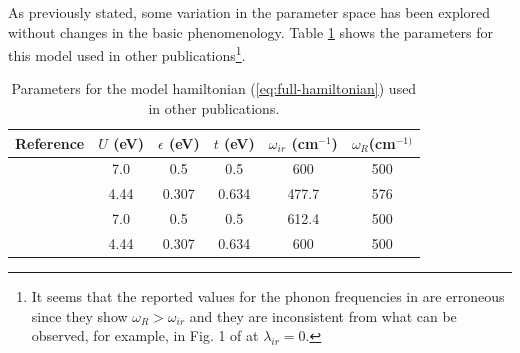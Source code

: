 As previously stated, some variation in the parameter space has been explored without changes in the basic phenomenology. Table \ref{tab:parameters} shows the parameters for this model used in other publications\footnote{It seems that the reported values for the phonon frequencies in \cite{Salkola1994, Salkola1995} are erroneous since they show $\omega_R > \omega_{ir}$ and they are inconsistent from what can be observed, for example, in Fig. 1 of \cite{Salkola1994} at $\lambda_{ir}=0$.}.

\begin{table}[ht]
  \centering
  \begin{tabular}[h]{| l | c | c | c | c | c |}
    \hline
    Reference & $U$ (eV) & $\epsilon$ (eV) & $t$ (eV) & $\omega_{ir}$ (cm$^{-1}$) & $\omega_R$(cm$^{-1)}$ \\
    \hline
    \cite{MustredeLeon1992} & 7.0 & 0.5 & 0.5 & 600 & 500 \\ 
    \cite{Salkola1994, Salkola1995} & 4.44 & 0.307 & 0.634 & 477.7 & 576  \\
    \cite{DeLeon1999, Leon2008, MirandaMena2007,Mena2006} & 7.0 & 0.5 & 0.5 & 612.4 & 500 \\ 
    \cite{MustredeLeon2000} & 4.44 & 0.307 & 0.634 & 600 & 500 \\
    \hline
  \end{tabular}
  \caption{Parameters for the model hamiltonian (\ref{eq:full-hamiltonian}) used in other publications.}
  \label{tab:parameters}
\end{table}
